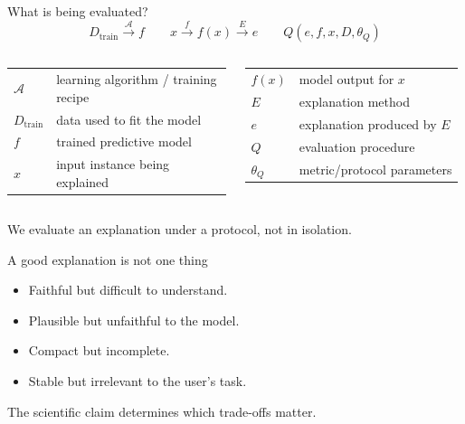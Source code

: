 \begin{frame}{What is being evaluated?}
\[
D_{\mathrm{train}} \xrightarrow{\mathcal{A}} f
\qquad
x \xrightarrow{f} f(x) \xrightarrow{E} e
\qquad
Q(e,f,x,D,\theta_Q)
\]
\small
\begin{columns}[T,onlytextwidth]
\begin{tabular}{@{}ll@{}}
$\mathcal{A}$ & learning algorithm / training recipe\\
$D_{\mathrm{train}}$ & data used to fit the model\\
$f$ & trained predictive model\\
$x$ & input instance being explained
\end{tabular}
\begin{tabular}{@{}ll@{}}
$f(x)$ & model output for $x$\\
$E$ & explanation method\\
$e$ & explanation produced by $E$\\
$Q$ & evaluation procedure\\
$\theta_Q$ & metric/protocol parameters
\end{tabular}
\end{columns}
\centering\medskip We evaluate an explanation under a protocol, not in isolation.
\end{frame}

\begin{frame}{A good explanation is not one thing}
\begin{itemize}
  \item Faithful but difficult to understand.
  \item Plausible but unfaithful to the model.
  \item Compact but incomplete.
  \item Stable but irrelevant to the user's task.
\end{itemize}
The scientific claim determines which trade-offs matter.
\end{frame}
